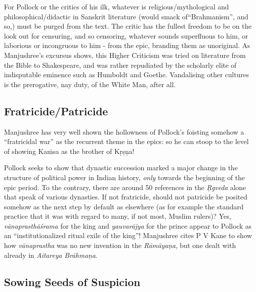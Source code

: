 For Pollock or the critics of his ilk, whatever is religious/mythological and philosophical/didactic in Sanskrit literature (would smack of\break “Brahmanism”, and so,) must be purged from the text. The critic has the fullest freedom to be on the look out for censuring, and so censoring, whatever sounds superfluous to him, or laborious or incongruous to him - from the epic, branding them as unoriginal. As Manjushree's excursus shows, this Higher Criticism was tried on literature from the Bible to Shakespeare, and was rather repudiated by the scholarly elite of indisputable eminence such as Humboldt and Goethe. Vandalising other cultures is the prerogative, nay duty, of the White Man, after all.\\[-20pt]

\subsection*{Fratricide/Patricide}

Manjushree has very well shown the hollowness of Pollock's foisting somehow a “fratricidal war” as the recurrent theme in the epics: so he can stoop to the level of showing Kaṁsa as the brother of Kṛṣṇa!

Pollock seeks to show that dynastic succession marked a major change in the structure of political power in Indian history, {\sl only} towards the beginning of the epic period. To the contrary, there are around 50 references in the {\sl Ṛgveda} alone that speak of various dynasties. If not fratricide, should not patricide be posited somehow as the next step by default as elsewhere (as for example the standard practice that it was with regard to many, if not most, Muslim rulers)? Yes, {\sl vānaprasthāśrama} for the king and {\sl yauvarājya} for the prince appear to Pollock as an “institutionalized ritual exile of the king”! Manjushree cites P V Kane to show how {\sl vānaprastha} was no new invention in the {\sl Rāmāyaṇa}, but one dealt with already in {\sl Aitareya Brāhmaṇa}.\\[-20pt]

\subsection*{Sowing Seeds of Suspicion}

